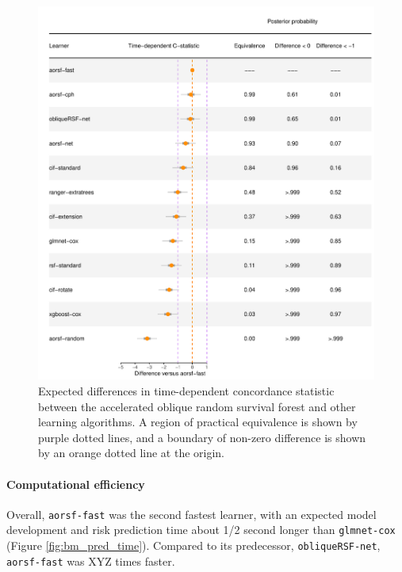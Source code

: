 \documentclass[twoside,11pt]{article}\usepackage[]{graphicx}\usepackage[]{xcolor}
\makeatletter
\def\maxwidth{ %
  \ifdim\Gin@nat@width>\linewidth
    \linewidth
  \else
    \Gin@nat@width
  \fi
}
\newenvironment{knitrout}{}{} %
\makeatother
\begin{document}
\begin{knitrout}
\color{fgcolor}\begin{figure}
\includegraphics[width=\maxwidth]{figure/bm_pred_model_viz_cstat-1} \caption[Expected differences in time-dependent concordance statistic between the accelerated oblique random survival forest and other learning algorithms]{Expected differences in time-dependent concordance statistic between the accelerated oblique random survival forest and other learning algorithms. A region of practical equivalence is shown by purple dotted lines, and a boundary of non-zero difference is shown by an orange dotted line at the origin.}\label{fig:bm_pred_model_viz_cstat}
\end{figure}

\end{knitrout}

\paragraph{Computational efficiency}

Overall, \texttt{aorsf-fast} was the second fastest learner, with an expected model development and risk prediction time about 1/2 second longer than \texttt{glmnet-cox} (Figure \ref{fig:bm_pred_time}). Compared to its predecessor, \texttt{obliqueRSF-net}, \texttt{aorsf-fast} was XYZ times faster.
\end{document}
